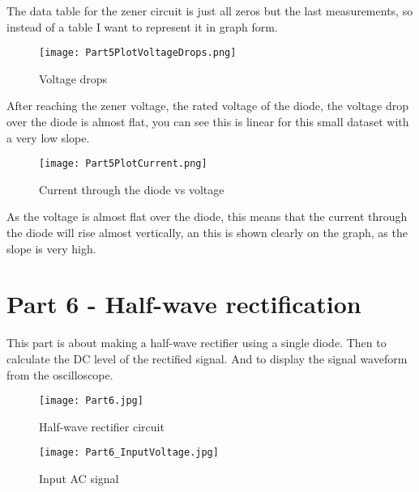\documentclass{article}
\begin{document}
The data table for the zener circuit is just all zeros but the last measurements, so instead of a table I want to represent it in graph form.

\clearpage

\begin{figure}[h] %
\centering
\texttt{[image: Part5PlotVoltageDrops.png]}
\caption{Voltage drops}
\label{fig:part5voltage}
\end{figure}

After reaching the zener voltage, the rated voltage of the diode, the voltage drop over the diode is almost flat, you can see this is linear for this small dataset with a very low slope.

\clearpage

\begin{figure}[h] %
\centering
\texttt{[image: Part5PlotCurrent.png]}
\caption{Current through the diode vs voltage}
\label{fig:part5current}
\end{figure}

As the voltage is almost flat over the diode, this means that the current through the diode will rise almost vertically, an this is shown clearly on the graph, as the slope is very high.


\section{Part 6 - Half-wave rectification}
This part is about making a half-wave rectifier using a single diode. Then to calculate the DC level of the rectified signal. And to display the signal waveform from the oscilloscope.

\begin{figure}[h] %
\centering
\texttt{[image: Part6.jpg]}
\caption{Half-wave rectifier circuit}
\label{fig:part6}
\end{figure}

\clearpage

\begin{figure}[h] %
\centering
\texttt{[image: Part6\_InputVoltage.jpg]}
\caption{Input AC signal}
\label{fig:part6input}
\end{figure}
\end{document}
